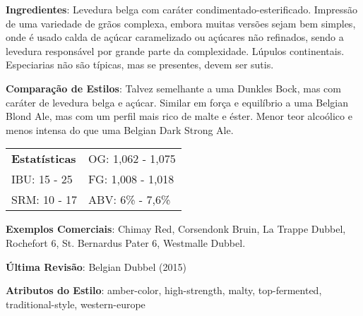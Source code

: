 \textbf{Ingredientes}: Levedura belga com caráter condimentado-esterificado. Impressão de uma variedade de grãos complexa, embora muitas versões sejam bem simples, onde é usado calda de açúcar caramelizado ou açúcares não refinados, sendo a levedura responsável por grande parte da complexidade. Lúpulos continentais. Especiarias não são típicas, mas se presentes, devem ser sutis.

\textbf{Comparação de Estilos}: Talvez semelhante a uma Dunkles Bock, mas com caráter de levedura belga e açúcar. Similar em força e equilíbrio a uma Belgian Blond Ale, mas com um perfil mais rico de malte e éster. Menor teor alcoólico e menos intensa do que uma Belgian Dark Strong Ale.

\begin{tabular}{@{}p{35mm}p{35mm}@{}}
  \textbf{Estatísticas} & OG: 1,062 - 1,075 \\
  IBU: 15 - 25  & FG: 1,008 - 1,018  \\
  SRM: 10 - 17  & ABV: 6\% - 7,6\%
\end{tabular}

\textbf{Exemplos Comerciais}: Chimay Red, Corsendonk Bruin, La Trappe Dubbel, Rochefort 6, St. Bernardus Pater 6, Westmalle Dubbel.

\textbf{Última Revisão}: Belgian Dubbel (2015)

\textbf{Atributos do Estilo}: amber-color, high-strength, malty, top-fermented, traditional-style, western-europe
